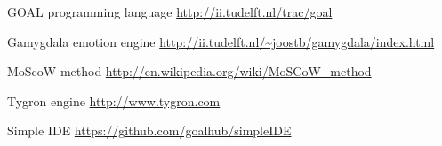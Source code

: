 \documentclass[]{article}
\begin{document}
\begin{thebibliography}{9}
	
	GOAL programming language
	\url{http://ii.tudelft.nl/trac/goal}
	
	Gamygdala emotion engine
	\url{http://ii.tudelft.nl/~joostb/gamygdala/index.html}
	
	MoScoW method
	\url{http://en.wikipedia.org/wiki/MoSCoW_method }
	
	Tygron engine
	\url{http://www.tygron.com }
	
	Simple IDE
	\url{https://github.com/goalhub/simpleIDE }
	
	
\end{thebibliography}
\end{document}
